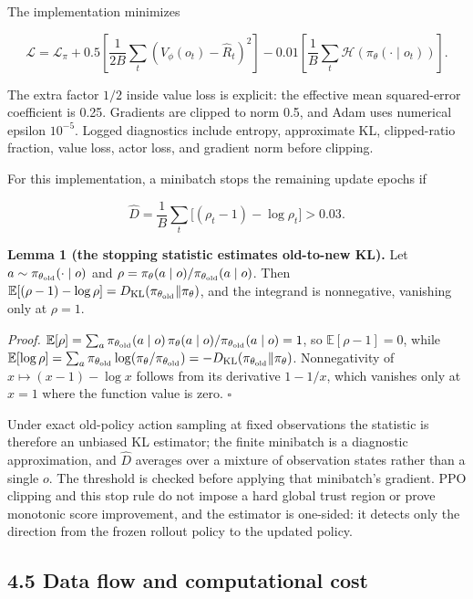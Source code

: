 \documentclass[
  11pt,
]{article}
\begin{document}
The implementation minimizes

\[
\mathcal L=\mathcal L_\pi+
0.5\left[\frac{1}{2B}\sum_t(V_\phi(o_t)-\widehat R_t)^2\right]
-0.01\left[\frac1B\sum_t\mathcal H(\pi_\theta(\cdot\mid o_t))\right].
\]

The extra factor \(1/2\) inside value loss is explicit: the effective
mean squared-error coefficient is 0.25. Gradients are clipped to norm
0.5, and Adam uses numerical epsilon \(10^{-5}\). Logged diagnostics
include entropy, approximate KL, clipped-ratio fraction, value loss,
actor loss, and gradient norm before clipping.

For this implementation, a minibatch stops the remaining update epochs
if

\[
\widehat D=\frac1B\sum_t\bigl[(\rho_t-1)-\log\rho_t\bigr]>0.03.
\]

\textbf{Lemma 1 (the stopping statistic estimates old-to-new KL).} Let
\(a\sim\pi_{\theta_{\rm old}}(\cdot\mid o)\) and
\(\rho=\pi_\theta(a\mid o)/\pi_{\theta_{\rm old}}(a\mid o)\). Then
\(\mathbb E[(\rho-1)-\log\rho]=D_{\mathrm{KL}}(\pi_{\theta_{\rm old}}\Vert\pi_\theta)\),
and the integrand is nonnegative, vanishing only at \(\rho=1\).

\emph{Proof.}
\(\mathbb E[\rho]=\sum_a\pi_{\theta_{\rm old}}(a\mid o)\,\pi_\theta(a\mid o)/\pi_{\theta_{\rm old}}(a\mid o)=1\),
so \(\mathbb E[\rho-1]=0\), while
\(\mathbb E[\log\rho]=\sum_a\pi_{\theta_{\rm old}}\log(\pi_\theta/\pi_{\theta_{\rm old}})=-D_{\mathrm{KL}}(\pi_{\theta_{\rm old}}\Vert\pi_\theta)\).
Nonnegativity of \(x\mapsto(x-1)-\log x\) follows from its derivative
\(1-1/x\), which vanishes only at \(x=1\) where the function value is
zero. \(\square\)

Under exact old-policy action sampling at fixed observations the
statistic is therefore an unbiased KL estimator; the finite minibatch is
a diagnostic approximation, and \(\widehat D\) averages over a mixture
of observation states rather than a single \(o\). The threshold is
checked before applying that minibatch's gradient. PPO clipping and this
stop rule do not impose a hard global trust region or prove monotonic
score improvement, and the estimator is one-sided: it detects only the
direction from the frozen rollout policy to the updated policy.

\subsection{4.5 Data flow and computational
cost}\label{data-flow-and-computational-cost}
\end{document}
